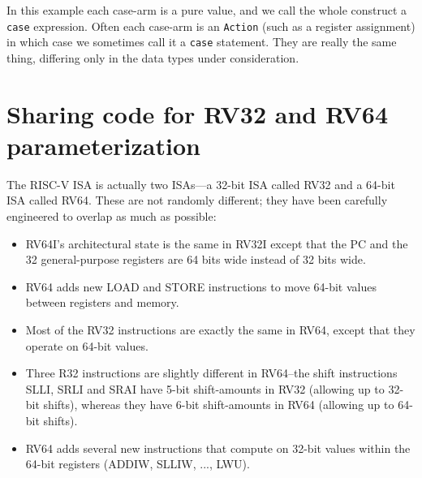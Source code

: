 \vspace{1ex}


In this example each case-arm is a pure value, and we call the whole
construct a \verb|case| expression.  Often each case-arm is an
\verb|Action| (such as a register assignment) in which case we
sometimes call it a \verb|case| statement.  They are really the same
thing, differing only in the data types under consideration.




\section{Sharing code for RV32 and RV64 {\via} parameterization}

\label{BSV_Paramterizing_XLEN}


The RISC-V ISA is actually two ISAs---a 32-bit ISA called RV32 and a
64-bit ISA called RV64.  These are not randomly different; they have
been carefully engineered to overlap as much as possible:

\begin{itemize}

 \item RV64I's architectural state is the same in RV32I except that
       the PC and the 32 general-purpose registers are 64 bits wide
       instead of 32 bits wide.

 \item RV64 adds new LOAD and STORE instructions to move 64-bit values
       between registers and memory.

 \item Most of the RV32 instructions are exactly the same in RV64,
       except that they operate on 64-bit values.


 \item Three R32 instructions are slightly different in RV64--the
       shift instructions SLLI, SRLI and SRAI have 5-bit shift-amounts
       in RV32 (allowing up to 32-bit shifts), whereas they have 6-bit
       shift-amounts in RV64 (allowing up to 64-bit shifts).

 \item RV64 adds several new instructions that compute on 32-bit
       values within the 64-bit registers (ADDIW, SLLIW, ..., LWU).

\end{itemize}


